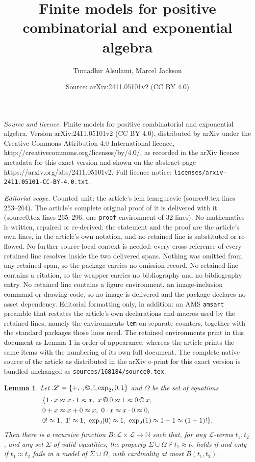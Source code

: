 \documentclass[10pt,a4paper]{amsart}
\title{Finite models for positive combinatorial and exponential algebra}
\author{Tumadhir Alsulami, Marcel Jackson}
\date{Source: arXiv:2411.05101v2 (CC BY 4.0)}
\newtheorem{lem}{Lemma}
\newcommand{\cc}{\mathbin{\textup{\copyright}}}
\begin{document}
\maketitle

\noindent\emph{Source and licence.} Finite models for positive combinatorial and exponential algebra. Version arXiv:2411.05101v2 (CC BY 4.0), distributed by arXiv under the Creative Commons Attribution 4.0 International licence, http://creativecommons.org/licenses/by/4.0/, as recorded in the arXiv licence metadata for this exact version and shown on the abstract page https://arxiv.org/abs/2411.05101v2. Full licence notice: \texttt{licenses/arxiv-2411.05101-CC-BY-4.0.txt}.\par\smallskip

\noindent\textit{Editorial scope.} Counted unit: the article's lem lem:gurevic (source0.tex lines 253--264). The article's complete original proof of it is delivered with it (source0.tex lines 265--296, one \texttt{proof} environment of 32 lines). No mathematics is written, repaired or re-derived: the statement and the proof are the article's own lines, in the article's own notation, and no retained line is substituted or re-flowed.  No further source-local context is needed: every cross-reference of every retained line resolves inside the two delivered spans.  Nothing was omitted from any retained span, so the package carries no omission record.  No retained line contains a citation, so the wrapper carries no bibliography and no bibliography entry.  No retained line contains a figure environment, an image-inclusion command or drawing code, so no image is delivered and the package declares no asset dependency.  Editorial formatting only, in addition: an AMS \texttt{amsart} preamble that restates the article's own declarations and macros used by the retained lines, namely the environments \texttt{lem} on separate counters, together with the standard packages those lines need.  The retained environments print in this document as Lemma 1 in order of appearance, whereas the article prints the same items with the numbering of its own full document.  The complete native source of the article as distributed in the arXiv e-print for this exact version is bundled unchanged as \texttt{sources/168184/source0.tex}.
\begin{lem}\label{lem:gurevic}
Let $\mathscr{L}= \{+,\cdot,\cc,!,\exp_2,0,1\}$ and $\Omega$ be the set of equations 
\begin{align*}
&\{1\cdot x\approx x\cdot 1\approx x,\  x\cc 0\approx 1\approx 0\cc x,\\
& 0+x\approx x+0\approx x,\ 0\cdot x\approx x\cdot 0\approx 0,\\
&0!\approx 1,\ 1!\approx 1,\ \exp_2(0)\approx 1,\ \exp_2(1)\approx 1+1\approx (1+1)!\}.
\end{align*}
Then there is a recursive function $B:\mathscr{L} \times \mathscr{L} \rightarrow \mathbb{N} $ such that, for any $\mathscr{L}$-terms $t_1, t_2$, and any set 
$\Sigma$ of valid equalities, the property
$\Sigma\cup\Omega\nvdash t_1\approx t_2$ holds
 if and only if $t_1\approx t_2$ fails in a model of $\Sigma\cup\Omega$, with cardinality at most $B(t_1,t_2)$.
\end{lem}
\end{document}
